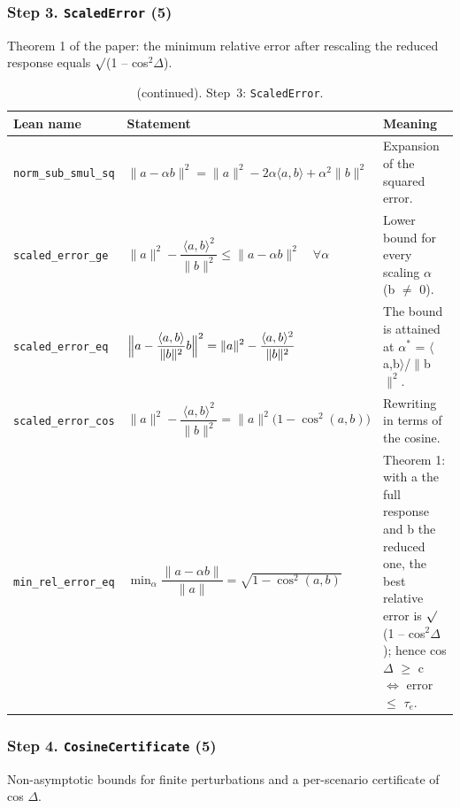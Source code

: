 \subsubsection*{Step 3. \texttt{ScaledError} (5)}
Theorem 1 of the paper: the minimum relative error after rescaling the reduced response equals $\surd$(1 -- cos$^2\Delta$).

\addtocounter{table}{-1}
{\small
\begin{longtable}{@{}>{\raggedright\arraybackslash}p{3.6cm}>{\raggedright\arraybackslash}p{6.6cm}>{\raggedright\arraybackslash}p{5.6cm}@{}}
\caption[]{(continued). Step~3: \texttt{ScaledError}.}\\
\toprule
Lean name & Statement & Meaning \\
\midrule
\endhead
\texttt{norm\_\allowbreak{}sub\_\allowbreak{}smul\_\allowbreak{}sq} & $\displaystyle \|a-\alpha b\|^2=\|a\|^2-2\alpha\langle a,b\rangle+\alpha^2\|b\|^2$ & Expansion of the squared error. \\[3pt]
\texttt{scaled\_\allowbreak{}error\_\allowbreak{}ge} & $\displaystyle \|a\|^2-\dfrac{\langle a,b\rangle^2}{\|b\|^2}\le\|a-\alpha b\|^2\quad\forall\alpha$ & Lower bound for every scaling $\alpha$ (b $\ne$ 0). \\[3pt]
\texttt{scaled\_\allowbreak{}error\_\allowbreak{}eq} & $\displaystyle \Bigl\|a-\dfrac{\langle a,b\rangle}{\|b\|^2}b\Bigr\|^2=\|a\|^2-\dfrac{\langle a,b\rangle^2}{\|b\|^2}$ & The bound is attained at $\alpha^*$ = $\langle$a,b$\rangle$/$\|$b$\|^2$. \\[3pt]
\texttt{scaled\_\allowbreak{}error\_\allowbreak{}cos} & $\displaystyle \|a\|^2-\dfrac{\langle a,b\rangle^2}{\|b\|^2}=\|a\|^2\bigl(1-\cos^2(a,b)\bigr)$ & Rewriting in terms of the cosine. \\[3pt]
\texttt{min\_\allowbreak{}rel\_\allowbreak{}error\_\allowbreak{}eq} & $\displaystyle \min_\alpha\dfrac{\|a-\alpha b\|}{\|a\|}=\sqrt{1-\cos^2(a,b)}$ & Theorem 1: with a the full response and b the reduced one, the best relative error is $\surd$(1 -- cos$^2\Delta$); hence cos $\Delta$ $\ge$ c $\Leftrightarrow$ error $\le$ $\tau_e$. \\[3pt]
\bottomrule
\end{longtable}
}

\subsubsection*{Step 4. \texttt{CosineCertificate} (5)}
Non-asymptotic bounds for finite perturbations and a per-scenario certificate of cos $\Delta$.


